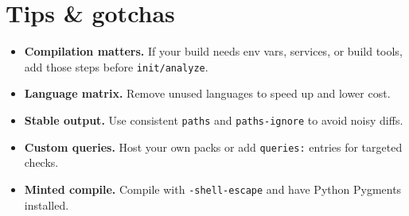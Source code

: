 \documentclass[11pt]{article}
\begin{document}
\section*{Tips \& gotchas}
\begin{itemize}[leftmargin=1.1em,itemsep=2pt,topsep=2pt]
  \item \textbf{Compilation matters.} If your build needs env vars, services, or build tools, add those steps before \texttt{init/analyze}.
  \item \textbf{Language matrix.} Remove unused languages to speed up and lower cost.
  \item \textbf{Stable output.} Use consistent \texttt{paths} and \texttt{paths-ignore} to avoid noisy diffs.
  \item \textbf{Custom queries.} Host your own packs or add \texttt{queries:} entries for targeted checks.
  \item \textbf{Minted compile.} Compile with \texttt{-shell-escape} and have Python Pygments installed.
\end{itemize}
\end{document}
